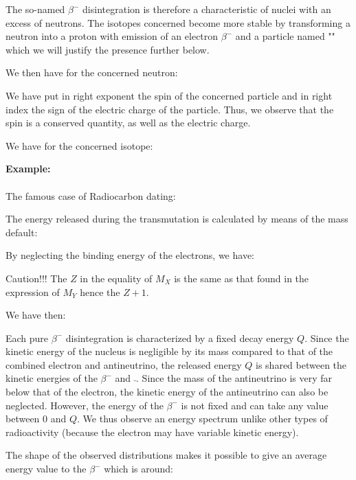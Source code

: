 	The so-named $\beta^{-}$ disintegration is therefore a characteristic of nuclei with an excess of neutrons. The isotopes concerned become more stable by transforming a neutron into a proton with emission of an electron $\beta^{-}$ and a particle named "" which we will justify the presence further below.

	We then have for the concerned neutron:
	
	We have put in right exponent the spin of the concerned  particle and in right index the sign of the electric charge of the particle. Thus, we observe that the spin is a conserved quantity, as well as the electric charge.

	We have for the concerned isotope:
	
	\begin{tcolorbox}[colframe=black,colback=white,sharp corners]
	\textbf{{\Large {}}Example:}\\\\
	The famous case of Radiocarbon dating:
	
	\end{tcolorbox}
	The energy released during the transmutation is calculated by means of the mass default:
	
	By neglecting the binding energy of the electrons, we have:
	
	
	\begin{tcolorbox}[colback=red!5,borderline={1mm}{2mm}{red!5},arc=0mm,boxrule=0pt]
	\bcbombe Caution!!! The $Z$ in the equality of $M_X$ is the same as that found in the expression of $M_Y$ hence the $Z + 1$.
	\end{tcolorbox}

	We have then:
	
	Each pure $\beta^{-}$ disintegration is characterized by a fixed decay energy $Q$. Since the kinetic energy of the nucleus is negligible by its mass compared to that of the combined electron and antineutrino, the released energy $Q$ is shared between the kinetic energies of the $\beta^{-}$ and $\bar{}$. Since the mass of the antineutrino is very far below that of the electron, the kinetic energy of the antineutrino can also be neglected. However, the energy of the $\beta^{-}$ is not fixed and can take any value between $0$ and $Q$. We thus observe an energy spectrum unlike other types of radioactivity (because the electron may have variable kinetic energy).

	The shape of the observed distributions makes it possible to give an average energy value to the $\beta^{-}$ which is around:
	
